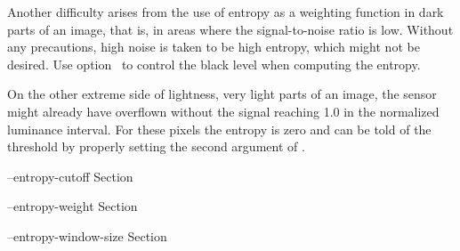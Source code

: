 Another difficulty arises from the use of entropy as a weighting
function in dark parts of an image, that is, in areas where the
signal-to-noise ratio is low.  Without any precautions, high noise is
taken to be high entropy, which might not be desired.  Use
option~ to control the black level when
computing the entropy.

On the other extreme side of lightness, very light parts of an image,
the sensor might already have overflown without the signal reaching
1.0 in the normalized luminance interval.  For these pixels the
entropy is zero and \App{} can be told of the threshold by properly
setting the second argument of .

\begin{optionsummary}
\item[--entropy-cutoff] Section~
\item[--entropy-weight] Section~
\item[--entropy-window-size] Section~
\end{optionsummary}

